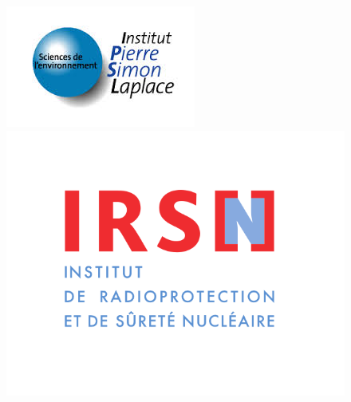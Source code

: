 \begin{figure}
\begin{minipage}[c]{0.15\linewidth}
\begin{center}
            \end{center}
        \end{minipage}
        \hfill
        \begin{minipage}[c]{0.15\linewidth}
            \begin{center}
                \includegraphics[height=0.09\textheight]{./logos/ipsl}
            \end{center}
        \end{minipage}
        \hfill
        \begin{minipage}[c]{0.15\linewidth}
            \begin{center}
                \includegraphics[height=0.09\textheight]{./logos/irsn}
            \end{center}
        \end{minipage}

    \end{figure}

